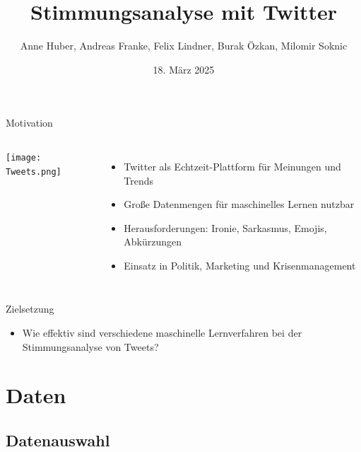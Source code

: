 \documentclass[aspectratio=169]{beamer} %
\title{Stimmungsanalyse mit Twitter}
\author[Team Twitter Sentiment]{Anne Huber, Andreas Franke, Felix Lindner, Burak Özkan, Milomir Soknic}
\institute{Projektpraktikum Web Science,\\Artificial Intelligence Group,\\Universität Hagen, Deutschland}
\date{18. März 2025}
\begin{document}
\begin{frame}
  \titlepage
\end{frame}

\begin{frame}{Motivation}
  \begin{columns}
    \centering
    \texttt{[image: Tweets.png]}

    \begin{itemize}
        \item Twitter als Echtzeit-Plattform für Meinungen und Trends
        \item Große Datenmengen für maschinelles Lernen nutzbar
        \item Herausforderungen: Ironie, Sarkasmus, Emojis, Abkürzungen
        \item Einsatz in Politik, Marketing und Krisenmanagement
    \end{itemize}
  \end{columns}
\end{frame}

\begin{frame}{Zielsetzung}
  \Large
  \begin{itemize}
      \item Wie effektiv sind verschiedene maschinelle Lernverfahren bei der Stimmungsanalyse von Tweets?
  \end{itemize}
\end{frame}


\section{Daten}


\subsection{Datenauswahl}
\end{document}
